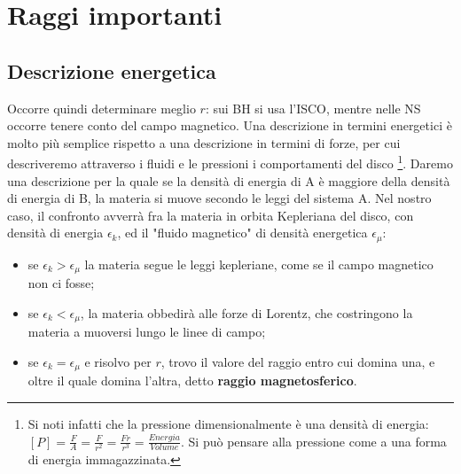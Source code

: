 \section{Raggi importanti}

\subsection{Descrizione energetica}
Occorre quindi determinare meglio $r$: sui BH si usa l'ISCO, mentre nelle NS occorre tenere conto del campo magnetico.
Una descrizione in termini energetici è molto più semplice rispetto a una descrizione in termini di forze, per cui descriveremo attraverso i fluidi e le pressioni i comportamenti del disco
\footnote{
Si noti infatti che la pressione dimensionalmente è una densità di energia: $[P] = \frac{F}{A} = \frac{F}{r^2} = \frac{Fr}{r^3} = \frac{Energia}{Volume} $. Si può pensare alla pressione come a una forma di energia immagazzinata.
}.
Daremo una descrizione per la quale se la densità di energia di A è maggiore della densità di energia di B, la materia si muove secondo le leggi del sistema A.
Nel nostro caso, il confronto avverrà fra la materia in orbita Kepleriana del disco, con densità di energia $\epsilon_k$, ed il "fluido magnetico" di densità energetica $\epsilon_\mu$:
\begin{itemize}
    \item se $\epsilon_k>\epsilon_\mu$ la materia segue le leggi kepleriane, come se il campo magnetico non ci fosse;
    \item se $\epsilon_k<\epsilon_\mu$, la materia obbedirà alle forze di Lorentz, che costringono la materia a muoversi lungo le linee di campo;
    \item se $\epsilon_k = \epsilon_\mu$ e risolvo per $r$, trovo il valore del raggio entro cui domina una, e oltre il quale domina l'altra, detto \textbf{raggio magnetosferico}.
\end{itemize}

